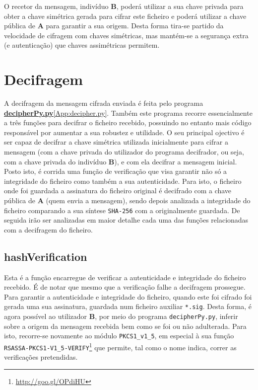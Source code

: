 \documentclass[a4paper,11pt,openright,oneside]{report}
\begin{document}
O recetor da mensagem, indivíduo \textbf{B}, poderá utilizar a sua chave privada para obter a chave simétrica gerada para cifrar este ficheiro e poderá utilizar a chave pública de \textbf{A} para garantir a sua origem. Desta forma tira-se partido da velocidade de cifragem com chaves simétricas, mas mantém-se a segurança extra (e autenticação) que chaves assimétricas permitem.

\section{Decifragem}

A decifragem da mensagem cifrada enviada é feita pelo programa \href{../Python/Receiver/decipherPy.py}{\textbf{decipherPy.py}}\ref{App:decipher.py}. Também este programa recorre essencialmente a três funções para decifrar o ficheiro recebido, possuindo no entanto mais código responsável por aumentar a sua robustez e utilidade. O seu principal ojectivo é ser capaz de decifrar a chave simétrica utilizada inicialmente para cifrar a mensagem (com a chave privada do utilizador do programa decifrador, ou seja, com a chave privada do indivíduo \textbf{B}), e com ela decifrar a mensagem inicial. Posto isto, é corrida uma função de verificação que visa garantir não só a integridade do ficheiro como também a sua autenticidade. Para isto, o ficheiro onde foi guardada a assinatura do ficheiro original é decifrado com a chave pública de \textbf{A} (quem envia a mensagem), sendo depois analizada a integridade do ficheiro comparando a sua síntese \verb|SHA-256| com a originalmente guardada. De seguida irão ser analizadas em maior detalhe cada uma das funções relacionadas com a decifragem do ficheiro.

\subsection{hashVerification}

Esta é a função encarregue de verificar a autenticidade e integridade do ficheiro recebido. É de notar que mesmo que a verificação falhe a decifragem prossegue.\\

Para garantir a autenticidade e integridade do ficheiro, quando este foi cifrado foi gerada uma sua assinatura, guardada num ficheiro auxiliar \verb|*.sig|. Desta forma, é agora possível ao utilizador \textbf{B}, por meio do programa \verb|decipherPy.py|, inferir sobre a origem da mensagem recebida bem como se foi ou não adulterada. Para isto, recorre-se novamente ao módulo \verb|PKCS1_v1_5|, em especial à sua função \verb|RSASSA-PKCS1-V1_5-VERIFY|\footnote{\url{http://goo.gl/OPdiHU}} que permite, tal como o nome indica, correr as verificações pretendidas.\\
\end{document}

